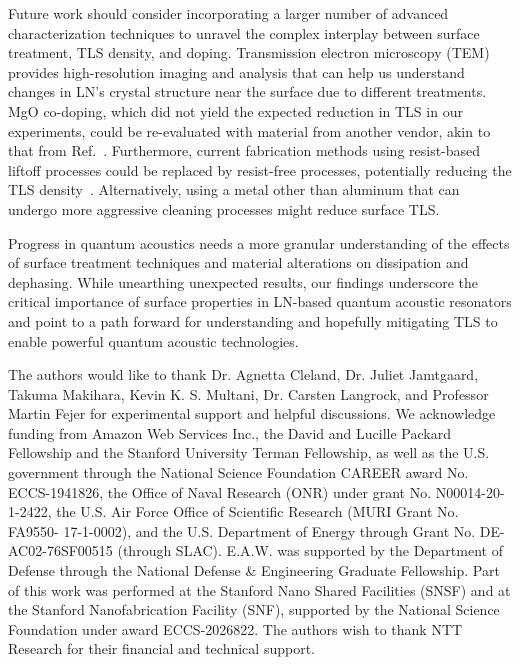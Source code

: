 \documentclass[
 prapplied,
 amsmath,amssymb,
 reprint, longbibliography, superscriptaddress
]{revtex4-2}
\begin{document}
Future work should consider incorporating a larger number of advanced characterization techniques to unravel the complex interplay between surface treatment, TLS density, and doping. Transmission electron microscopy (TEM) provides high-resolution imaging and analysis that can help us understand changes in LN's crystal structure near the surface due to different treatments. MgO co-doping, which did not yield the expected reduction in TLS in our experiments, could be re-evaluated with material from another vendor, akin to that from Ref.~\cite{wollack2021loss}. Furthermore, current fabrication methods using resist-based liftoff processes could be replaced by resist-free processes, potentially reducing the TLS density~\cite{tsioutsios2020free}. Alternatively, using a metal other than aluminum that can undergo more aggressive cleaning processes might reduce surface TLS.

Progress in quantum acoustics needs a more granular understanding of the effects of surface treatment techniques and material alterations on dissipation and dephasing. While unearthing unexpected results, our findings underscore the critical importance of surface properties in LN-based quantum acoustic resonators and point to a path forward for understanding and hopefully mitigating TLS to enable powerful quantum acoustic technologies. 


\begin{acknowledgments}
The authors would like to thank Dr. Agnetta Cleland, Dr. Juliet Jamtgaard, Takuma Makihara, Kevin K. S. Multani, Dr. Carsten Langrock, and Professor Martin Fejer for experimental support and helpful discussions. We acknowledge funding from Amazon Web Services Inc., the David and Lucille Packard Fellowship and the Stanford University Terman Fellowship, as well as the U.S. government through the National Science Foundation CAREER award No. ECCS-1941826, the Office of Naval Research (ONR) under grant No. N00014-20-1-2422, the U.S. Air Force Office of Scientific Research (MURI Grant No. FA9550- 17-1-0002), and the U.S. Department of Energy through Grant No. DE-AC02-76SF00515 (through SLAC). E.A.W. was supported by the Department of Defense through the National Defense \& Engineering Graduate Fellowship. Part of this work was performed at the Stanford Nano Shared Facilities (SNSF) and at the Stanford Nanofabrication Facility (SNF), supported by the National Science Foundation under award ECCS-2026822. The authors wish to thank NTT Research for their financial and technical support.
\end{acknowledgments}
\end{document}
